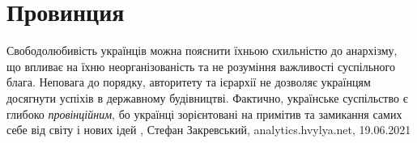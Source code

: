  
 
 
 
 
\chapter{Провинция}

Свободолюбивість українців можна пояснити їхньою схильністю до анархізму, що
впливає на їхню неорганізованість та не розуміння важливості суспільного блага.
Неповага до порядку, авторитету та ієрархії не дозволяє українцям досягнути
успіхів в державному будівництві. Фактично, українське суспільство є глибоко
\emph{провінційним}, бо українці зорієнтовані на примітив та замикання самих себе від
світу і нових ідей
, Стефан Закревський, 
analytics.hvylya.net, 19.06.2021

